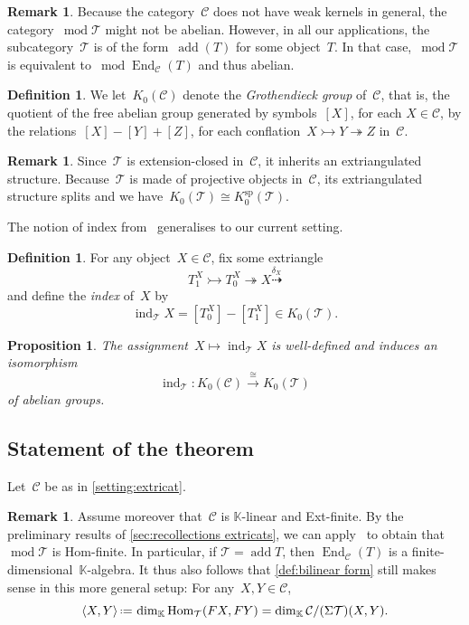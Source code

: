 \documentclass{amsart}
\newtheorem{proposition}[theorem]{Proposition}
\theoremstyle{definition}
\newtheorem{definition}[theorem]{Definition}
\newtheorem{remark}[theorem]{Remark}
\newcommand{\eqdef}{\mbox{\,\raisebox{0.2ex}{\scriptsize\ensuremath{\mathrm:}}\ensuremath{=}\,}} %
\newcommand{\darkblue}{\color{darkblue}} %
\newcommand{\defn}[1]{\textsl{\darkblue #1}} %
\newcommand{\field}{\mathbb{K}}
\newcommand{\cat}{\mathcal{C}}
\newcommand{\Hom}[1]{\operatorname{Hom}_{#1}}
\newcommand{\susp}{\Sigma}
\newcommand{\add}{\operatorname{add}}
\newcommand{\MOD}{\operatorname{mod}}
\newcommand{\End}[1]{\operatorname{End}_{#1}}
\newcommand{\spl}{\operatorname{sp}}
\newcommand{\Ksp}{K_0^{\spl}}
\newcommand{\ind}{\operatorname{ind}}
\newcommand{\tc}{\mathcal{T}}
\newcommand{\infl}{\rightarrowtail}
\newcommand{\defl}{\twoheadrightarrow}
\newcommand{\modt}{\MOD\tc}
\newcommand{\kzero}[1]{K_0(#1)}
\begin{document}
\begin{remark}
Because the category~$\cat$ does not have weak kernels in general, the category~$\modt$ might not be abelian.
However, in all our applications, the subcategory~$\tc$ is of the form~$\add(T)$ for some object~$T$.
In that case,~$\modt$ is equivalent to~$\MOD\End{\cat}(T)$ and thus abelian.
\end{remark}


\begin{definition}
We let~$\kzero{\cat}$ denote the \defn{Grothendieck group} of~$\cat$, that is, the quotient of the free abelian group generated by symbols~$[X]$, for each $X\in\cat$, by the relations~$[X]-[Y]+[Z]$, for each conflation~$X\infl Y\defl Z$ in~$\cat$.
\end{definition}

\begin{remark}
Since~$\tc$ is extension-closed in~$\cat$, it inherits an extriangulated structure.
Because~$\tc$ is made of projective objects in~$\cat$, its extriangulated structure splits and we have~$\kzero{\tc}\cong\Ksp(\tc)$.
\end{remark}


The notion of index from~\cite{DehyKeller,Palu} generalises to our current setting.

\begin{definition}
For any object~$X\in\cat$, fix some extriangle
\[
T_1^X \infl T_0^X \defl X \overset{\delta_X}{\dashrightarrow}
\]
and define the \defn{index} of~$X$ by
\[
\ind_\tc X = [T_0^X]-[T_1^X]\in\kzero{\tc}.
\]
\end{definition}

\begin{proposition}
\label{prop:index iso extricat}
 The assignment~$X\mapsto\ind_\tc X$ is well-defined and induces an isomorphism
\[
\ind_\tc : \kzero{\cat} \overset{\cong}{\longrightarrow} \kzero{\tc}
\]
of abelian groups.
\end{proposition}


\subsection{Statement of the theorem}
\label{sec:Statment extricats}

Let~$\cat$ be as in \cref{setting:extricat}.

\begin{remark}
Assume moreover that~$\cat$ is $\field$-linear and Ext-finite.
By the preliminary results of \cref{sec:recollections extricats}, we can apply~\cite[Prop.~4.2]{IyamaNakaokaPalu} to obtain that~$\modt$ is Hom-finite.
In particular, if $\tc=\add T$, then $\End{\cat}(T)$ is a finite-dimensional~$\field$-algebra.
It thus also follows that \cref{def:bilinear form} still makes sense in this more general setup: For any~$X,Y\in\cat$,
\[
\langle X,Y\rangle \eqdef \dim_\field \Hom{\tc}(FX,FY) = \dim_\field \cat/(\susp\tc)(X,Y).
\]
\end{remark}
\end{document}
